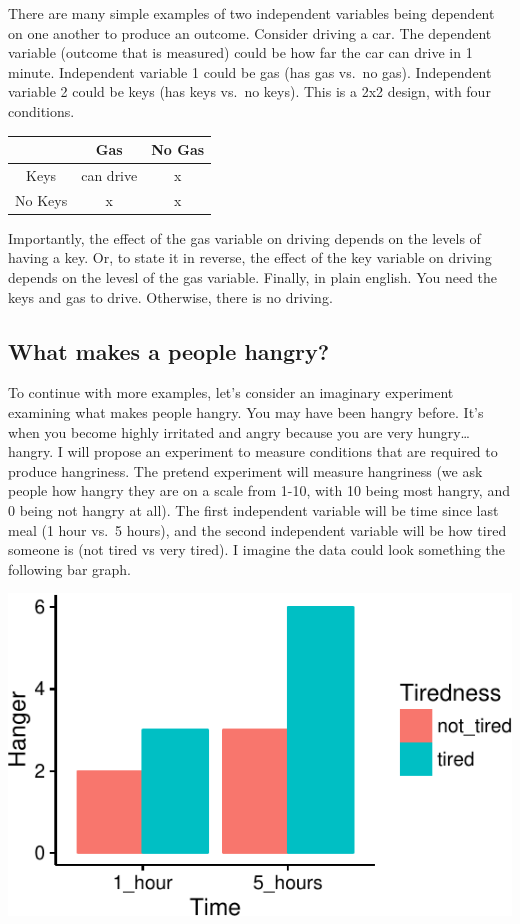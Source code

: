 There are many simple examples of two independent variables being
dependent on one another to produce an outcome. Consider driving a car.
The dependent variable (outcome that is measured) could be how far the
car can drive in 1 minute. Independent variable 1 could be gas (has gas
vs.~no gas). Independent variable 2 could be keys (has keys vs.~no
keys). This is a 2x2 design, with four conditions.

\begin{longtable}[]{@{}ccc@{}}
\toprule
& Gas & No Gas\tabularnewline
\midrule
\endhead
Keys & can drive & x\tabularnewline
No Keys & x & x\tabularnewline
\bottomrule
\end{longtable}

Importantly, the effect of the gas variable on driving depends on the
levels of having a key. Or, to state it in reverse, the effect of the
key variable on driving depends on the levesl of the gas variable.
Finally, in plain english. You need the keys and gas to drive.
Otherwise, there is no driving.

\subsection{What makes a people
hangry?}\label{what-makes-a-people-hangry}

To continue with more examples, let's consider an imaginary experiment
examining what makes people hangry. You may have been hangry before.
It's when you become highly irritated and angry because you are very
hungry\ldots{}hangry. I will propose an experiment to measure conditions
that are required to produce hangriness. The pretend experiment will
measure hangriness (we ask people how hangry they are on a scale from
1-10, with 10 being most hangry, and 0 being not hangry at all). The
first independent variable will be time since last meal (1 hour vs.~5
hours), and the second independent variable will be how tired someone is
(not tired vs very tired). I imagine the data could look something the
following bar graph.

\includegraphics{Factorial_files/figure-latex/unnamed-chunk-10-1}

